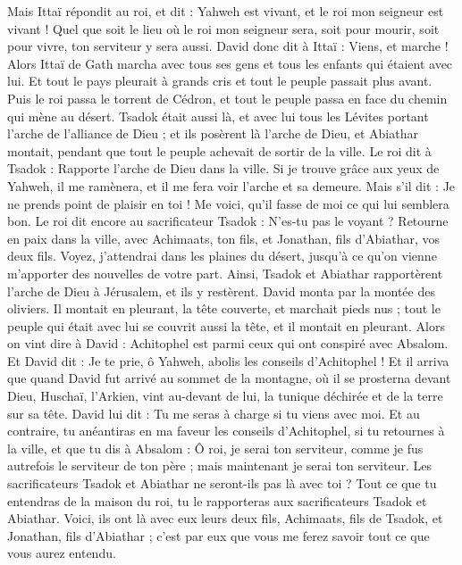 \begin{multicols}{2}
Mais Ittaï répondit au roi, et dit : Yahweh est vivant, et le roi mon seigneur est vivant ! Quel que soit le lieu où le roi mon seigneur sera, soit pour mourir, soit pour vivre, ton serviteur y sera aussi.
David donc dit à Ittaï : Viens, et marche ! Alors Ittaï de Gath marcha avec tous ses gens et tous les enfants qui étaient avec lui.
Et tout le pays pleurait à grands cris et tout le peuple passait plus avant. Puis le roi passa le torrent de Cédron, et tout le peuple passa en face du chemin qui mène au désert.
Tsadok était aussi là, et avec lui tous les Lévites portant l'arche de l'alliance de Dieu ; et ils posèrent là l'arche de Dieu, et Abiathar montait, pendant que tout le peuple achevait de sortir de la ville.
Le roi dit à Tsadok : Rapporte l'arche de Dieu dans la ville. Si je trouve grâce aux yeux de Yahweh, il me ramènera, et il me fera voir l'arche et sa demeure.
Mais s'il dit : Je ne prends point de plaisir en toi ! Me voici, qu'il fasse de moi ce qui lui semblera bon.
Le roi dit encore au sacrificateur Tsadok : N'es-tu pas le voyant ? Retourne en paix dans la ville, avec Achimaats, ton fils, et Jonathan, fils d'Abiathar, vos deux fils.
Voyez, j'attendrai dans les plaines du désert, jusqu'à ce qu'on vienne m'apporter des nouvelles de votre part.
Ainsi, Tsadok et Abiathar rapportèrent l'arche de Dieu à Jérusalem, et ils y restèrent.
David monta par la montée des oliviers. Il montait en pleurant, la tête couverte, et marchait pieds nus ; tout le peuple qui était avec lui se couvrit aussi la tête, et il montait en pleurant.
Alors on vint dire à David : Achitophel est parmi ceux qui ont conspiré avec Absalom. Et David dit : Je te prie, ô Yahweh, abolis les conseils d'Achitophel !
Et il arriva que quand David fut arrivé au sommet de la montagne, où il se prosterna devant Dieu, Huschaï, l'Arkien, vint au-devant de lui, la tunique déchirée et de la terre sur sa tête.
David lui dit : Tu me seras à charge si tu viens avec moi.
Et au contraire, tu anéantiras en ma faveur les conseils d'Achitophel, si tu retournes à la ville, et que tu dis à Absalom : Ô roi, je serai ton serviteur, comme je fus autrefois le serviteur de ton père ; mais maintenant je serai ton serviteur.
Les sacrificateurs Tsadok et Abiathar ne seront-ils pas là avec toi ? Tout ce que tu entendras de la maison du roi, tu le rapporteras aux sacrificateurs Tsadok et Abiathar.
Voici, ils ont là avec eux leurs deux fils, Achimaats, fils de Tsadok, et Jonathan, fils d'Abiathar ; c'est par eux que vous me ferez savoir tout ce que vous aurez entendu.

\end{multicols}
